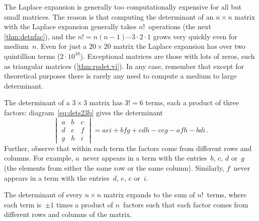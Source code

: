 \begin{example}
\begin{enumerate}
\end{enumerate}
\end{example}








The Laplace expansion is generally too computationally expensive for all but small matrices.
The reason is that computing the determinant of an \(n\times n\) matrix with the Laplace expansion generally takes \(n!\)~operations (the next \autoref{thm:detnfac}), and the  \(n!=n(n-1)\cdots3\cdot2\cdot1\) grows very quickly even for medium~\(n\).
Even for just a \(20\times20\) matrix the Laplace expansion has over two quintillion terms (\(2\cdot10^{18}\)).
Exceptional matrices are those with lots of zeros, such as triangular matrices (\autoref{thm:rpdet:vi}).
In any case, remember that except for theoretical purposes there is rarely any need to compute a medium to large determinant.



\begin{example} \label{eg:}
The determinant of a \(3\times3\) matrix has \(3!=6\) terms, each a product of three factors:
diagram~\eqref{eq:dets23b} gives the determinant
\begin{equation*}
\begin{vmatrix} a&b&c\\d&e&f\\g&h&i \end{vmatrix}=aei+bfg+cdh-ceg-afh-bdi\,.
\end{equation*}
Further, observe that within each term the factors come from different rows and columns.
For example, \(a\)~never appears in a term with the entries~\(b\), \(c\), \(d\) or~\(g\) (the elements from either the same row or the same column).
Similarly, \(f\)~never appears in a term with the entries~\(d\), \(e\), \(c\) or~\(i\).
\end{example}



\begin{theorem} \label{thm:detnfac}
The determinant of every \(n\times n\) matrix expands to the sum of \(n!\)~terms, where each term is~\(\pm1\) times a product of \(n\)~factors such that each factor comes from different rows and columns of the matrix.
\end{theorem}


